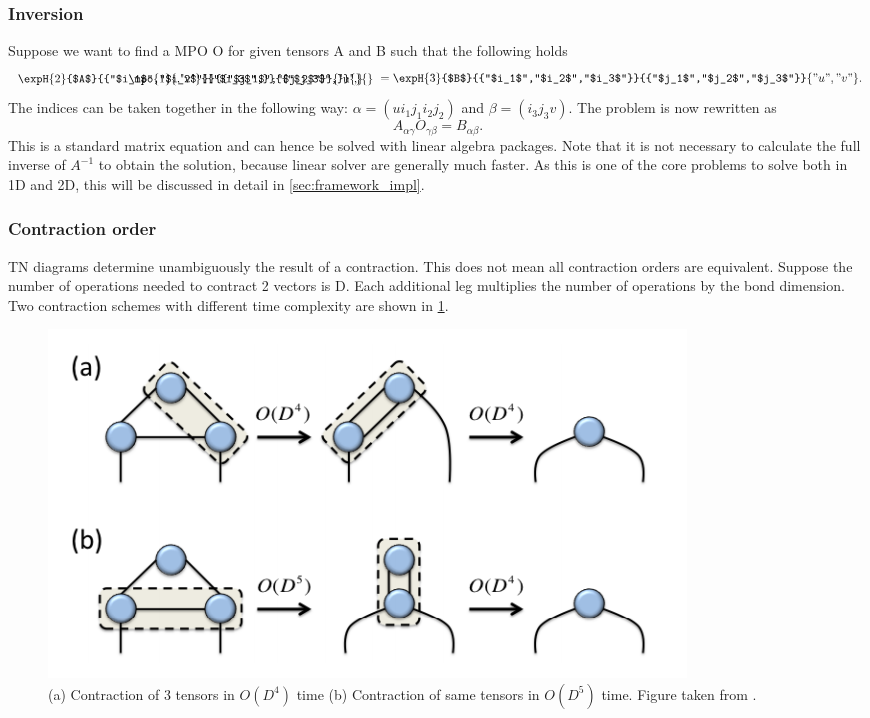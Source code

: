 \subsubsection{Inversion}

\def \figone {\expH{2}{$A$}{{"$i_1$","$i_2$"}}{{"$j_1$","$j_2$"}}{{"u",}}}
\def \figthree {\expH{3}{$B$}{{"$i_1$","$i_2$","$i_3$"}}{{"$j_1$","$j_2$","$j_3$"}}{{"u","v"}}}
\def \figtwo {\mpo{1}{{,"v"}}{{"$i_3$",}}{{"$j_3$",}}{}{}}

Suppose we want to find a \Gls{MPO} O for given tensors A and B such that the following holds
\begin{equation}
    \combineTikz{ \figone }{\figtwo}{1.8} =  \figthree .
\end{equation}
The indices can be taken together in the following way: $\alpha = (u i_1 j_1  i_2 j_2)$ and $\beta = (i_3 j_3 v)$. The problem is now rewritten as
\begin{equation}
    A_{\alpha \gamma} O_{\gamma \beta} = B_{\alpha \beta} .
\end{equation}
This is a standard matrix equation and can hence be solved with linear algebra packages. Note that it is not necessary to calculate the full inverse of $A^{-1}$ to obtain the solution, because linear solver are generally much faster. As this is one of the core problems to solve both in 1D and 2D, this will be discussed in detail in \cref{sec:framework_impl}.

\subsubsection{Contraction order}

\Gls{TN} diagrams determine unambiguously the result of a contraction. This does not mean all contraction orders are equivalent. Suppose the number of operations needed to contract 2 vectors is D. Each additional leg multiplies the number of operations by the bond dimension. Two contraction schemes with different time complexity are shown in \cref{fig:tnalgs:cont_ord}.

\begin{figure}[!htbp]
    \center
    \includegraphics[width=0.8 \textwidth]{Figuren/tnalgs/contraction_order.png}
    \caption{ (a) Contraction of 3 tensors in $O(D^4)$ time (b) Contraction of same tensors in $O(D^5)$ time. Figure taken from \cite{Orus2014}.  }
    \label{fig:tnalgs:cont_ord}
\end{figure}